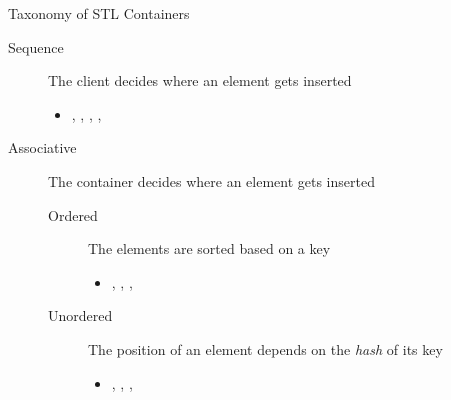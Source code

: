 \begin{frame}{Taxonomy of STL Containers}

  \begin{description}
  \item[Sequence] The client decides where an element gets inserted
    \begin{itemize}
    \item \textbf{}, , ,
      , \textbf{}
    \end{itemize}
  \item[Associative] The container decides where an element gets
    inserted
    \begin{description}
    \item[Ordered] The elements are sorted based on a key
      \begin{itemize}
      \item \textbf{}, , , 
      \end{itemize}
    \item[Unordered] The position of an element depends on the \textit{hash} of
      its key
      \begin{itemize}
      \item {}, ,
        , 
      \end{itemize}
    \end{description}
  \end{description}

\end{frame}

